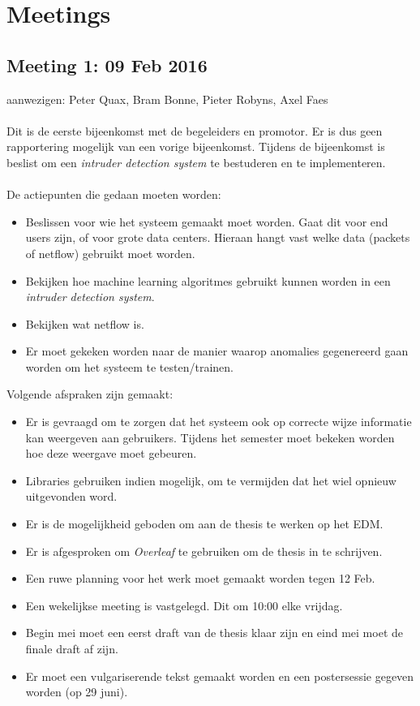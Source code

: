 
\chapter{Meetings} %

\label{AppendixA} %

\section{Meeting 1: 09 Feb 2016}

aanwezigen: Peter Quax, Bram Bonne, Pieter Robyns, Axel Faes\\
\\
Dit is de eerste bijeenkomst met de begeleiders en promotor. Er is dus geen rapportering mogelijk van een vorige bijeenkomst. Tijdens de bijeenkomst is beslist om een \textit{intruder detection system} te bestuderen en te implementeren. \\
\\
De actiepunten die gedaan moeten worden:
\begin{itemize}  
        \item Beslissen voor wie het systeem gemaakt moet worden. Gaat dit voor end users zijn, of voor grote data centers. Hieraan hangt vast welke data (packets of netflow) gebruikt moet worden.
        \item Bekijken hoe machine learning algoritmes gebruikt kunnen worden in een \textit{intruder detection system}.
        \item Bekijken wat netflow is.
        \item Er moet gekeken worden naar de manier waarop anomalies gegenereerd gaan worden om het systeem te testen/trainen.
\end{itemize}

\noindent Volgende afspraken zijn gemaakt:
\begin{itemize}  
		\item Er is gevraagd om te zorgen dat het systeem ook op correcte wijze informatie kan weergeven aan gebruikers. Tijdens het semester moet bekeken worden hoe deze weergave moet gebeuren.
        \item Libraries gebruiken indien mogelijk, om te vermijden dat het wiel opnieuw uitgevonden word.
        \item Er is de mogelijkheid geboden om aan de thesis te werken op het EDM.
        \item Er is afgesproken om \textit{Overleaf} te gebruiken om de thesis in te schrijven.
        \item Een ruwe planning voor het werk moet gemaakt worden tegen 12 Feb.
        \item Een wekelijkse meeting is vastgelegd. Dit om 10:00 elke vrijdag.
        \item Begin mei moet een eerst draft van de thesis klaar zijn en eind mei moet de finale draft af zijn. 
        \item Er moet een vulgariserende tekst gemaakt worden en een postersessie gegeven worden (op 29 juni).
\end{itemize}
